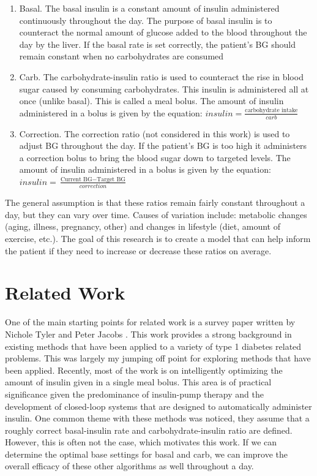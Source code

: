 \documentclass[11pt]{article}
\begin{document}
\begin{enumerate}
    \item Basal. The basal insulin is a constant amount of insulin administered continuously throughout the day.
    The purpose of basal insulin is to counteract the normal amount of glucose added to the blood throughout the day by the liver.
    If the basal rate is set correctly, the patient's BG should remain constant when no carbohydrates are consumed

    \item Carb. The carbohydrate-insulin ratio is used to counteract the rise in blood sugar caused by consuming carbohydrates. 
    This insulin is administered all at once (unlike basal). This is called a meal bolus.
    The amount of insulin administered in a bolus is given by the equation:
    $insulin = \frac{\text{carbohydrate intake}}{carb}$

    \item Correction. The correction ratio (not considered in this work) is used to adjust BG throughout the day. 
    If the patient's BG is too high it administers a correction bolus to bring the blood sugar down to targeted levels.
    The amount of insulin administered in a bolus is given by the equation:
    $insulin = \frac{\text{Current BG} - \text{Target BG}}{correction}$

\end{enumerate}

The general assumption is that these ratios remain fairly constant throughout a day, but they can vary over time.
Causes of variation include: metabolic changes (aging, illness, pregnancy, other) and changes in lifestyle (diet, amount of exercise, etc.).
The goal of this research is to create a model that can help inform the patient if they need to increase or decrease these ratios on average.


\section{Related Work}
One of the main starting points for related work is a survey paper written by Nichole Tyler and Peter Jacobs \cite{tyler2020artificial}.
This work provides a strong background in existing methods that have been applied to a variety of type 1 diabetes related problems.
This was largely my jumping off point for exploring methods that have been applied.
Recently, most of the work is on intelligently optimizing the amount of insulin given in a single meal bolus. 
This area is of practical significance given the predominance of insulin-pump therapy 
and the development of closed-loop systems that are designed to automatically administer insulin.
One common theme with these methods was noticed, they assume that a roughly correct basal-insulin rate and carbohydrate-insulin ratio are defined.
However, this is often not the case, which motivates this work. 
If we can determine the optimal base settings for basal and carb, we can improve the overall efficacy of these other algorithms as well throughout a day.
\end{document}
